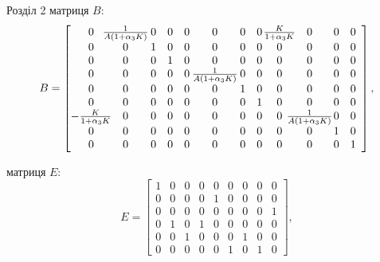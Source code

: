 \documentclass[8pt]{beamer}
\numberwithin{figure}{section}
\numberwithin{equation}{section}
\numberwithin{table}{section}
\begin{document}
\begin{frame}{Розділ 2}
матриця $B$:
\begin{equation}
B=
\left[\begin{array}{@{}c@{\hspace{-8pt}}c@{\hspace{2pt}}ccc@{\hspace{2pt}}c@{\hspace{2pt}}cc@{\hspace{1pt}}c@{\hspace{-8pt}}c@{\hspace{1pt}}cc}
0 & \frac{1}{A \left(1+ \alpha_{3} K \right)} & 0 & 0 & 0 & 0 & 0 & 0 & \frac{K}{1+ \alpha_{3} K } & 0 & 0 & 0\\0 & 0 & 1 & 0 & 0 & 0 & 0 & 0 & 0 & 0 & 0 & 0\\0 & 0 & 0 & 1 & 0 & 0 & 0 & 0 & 0 & 0 & 0 & 0\\0 & 0 & 0 & 0 & 0 & \frac{1}{A \left(1+ \alpha_{3} K \right)} & 0 & 0 & 0 & 0 & 0 & 0\\0 & 0 & 0 & 0 & 0 & 0 & 1 & 0 & 0 & 0 & 0 & 0\\0 & 0 & 0 & 0 & 0 & 0 & 0 & 1 & 0 & 0 & 0 & 0\\- \frac{K}{1+ \alpha_{3} K } & 0 & 0 & 0 & 0 & 0 & 0 & 0 & 0 & \frac{1}{A \left(1+ \alpha_{3} K \right)} & 0 & 0\\0 & 0 & 0 & 0 & 0 & 0 & 0 & 0 & 0 & 0 & 1 & 0\\0 & 0 & 0 & 0 & 0 & 0 & 0 & 0 & 0 & 0 & 0 & 1\end{array}\right],
\end{equation}

матриця $E$:
\begin{equation}
E=\left[\begin{matrix}1 & 0 & 0 & 0 & 0 & 0 & 0 & 0 & 0\\0 & 0 & 0 & 0 & 1 & 0 & 0 & 0 & 0\\0 & 0 & 0 & 0 & 0 & 0 & 0 & 0 & 1\\0 & 1 & 0 & 1 & 0 & 0 & 0 & 0 & 0\\0 & 0 & 1 & 0 & 0 & 0 & 1 & 0 & 0\\0 & 0 & 0 & 0 & 0 & 1 & 0 & 1 & 0\end{matrix}\right],
\end{equation}
\end{frame}
\end{document}
